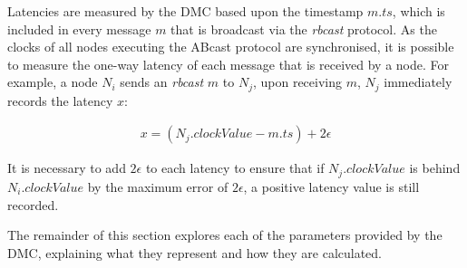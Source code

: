         Latencies are measured by the DMC based upon the timestamp $m.ts$, which is included in every message $m$ that is broadcast via the \emph{rbcast} protocol.  As the clocks of all nodes executing the \textsf{ABcast} protocol are synchronised, it is possible to measure the one-way latency of each message that is received by a node.  For example, a node $N_i$ sends an \emph{rbcast} $m$ to $N_j$, upon receiving $m$, $N_j$ immediately records the latency $x$:

        \begin{equation}
             \begin{aligned}
                 x = (N_j.clockValue - m.ts) + 2\epsilon
             \end{aligned}
        \end{equation}        
        
        It is necessary to add $2\epsilon$ to each latency to ensure that if $N_j.clockValue$ is behind $N_i.clockValue$ by the maximum error of $2\epsilon$, a positive latency value is still recorded.  
                                
        The remainder of this section explores each of the parameters provided by the DMC, explaining what they represent and how they are calculated.  
        

